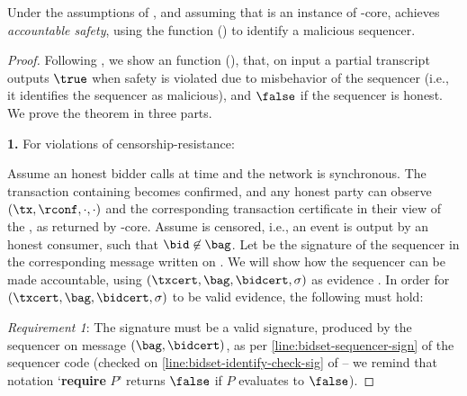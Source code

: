 \begin{lemma}\label{lem:bidset-accountability}
    Under the assumptions of , and assuming that \podInst is an instance of \podtm-core,  achieves \emph{accountable safety}, using the \identifySequencer{} function () to identify a malicious sequencer.
\end{lemma}
\begin{proof}
    Following , we show an \identifySequencer{\tran} function (), that, on input a partial transcript \tran outputs $\true$ when safety is violated due to misbehavior of the sequencer (i.e., it identifies the sequencer as malicious), and $\false$ if the sequencer is honest.
    We prove the theorem in three parts.

    \textbf{1.} For violations of censorship-resistance:

    \noindent
    Assume an honest bidder calls \opSubmitBid{\bid} at time \tzero and the network is synchronous.
    The transaction \tx containing \bid becomes confirmed, and any honest party can observe $(\tx, \rconf, \cdot, \cdot)$ and the corresponding transaction certificate \txcert in their view of the \podtm, as returned by \podtm-core.
    Assume \bid is censored, i.e., an event \opResult{\bag, \bidcert} is output by an honest consumer, such that $\bid \not \in \bag$.
    Let \sig be the signature of the sequencer in the corresponding \msgbidresult{(\bag, \bidcert, \sigma)} message written on \podInst.
    We will show how the sequencer can be made accountable, using $(\txcert, \bag, \bidcert, \sigma)$ as evidence \tran.
    In order for $(\txcert, \bag, \bidcert, \sigma)$ to be valid evidence, the following must hold:

    \emph{Requirement 1}: The signature \sig must be a valid signature, produced by the sequencer on message $(\bag, \bidcert)$, as per \cref{line:bidset-sequencer-sign} of the sequencer code (checked on \cref{line:bidset-identify-check-sig} of  -- we remind that notation `\textbf{require} $P$' returns $\false$ if $P$ evaluates to $\false$).



\end{proof}
